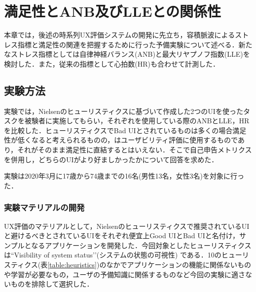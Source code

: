 \chapter{満足性とANB及びLLEとの関係性}
\label{chap:pulsewave}

本章では，後述の時系列UX評価システムの開発に先立ち，容積脈波によるストレス指標と満足性の関連を把握するために行った予備実験について述べる．新たなストレス指標としては自律神経バランス(ANB)と最大リヤプノフ指数(LLE)を検討した．また，従来の指標として心拍数(HR)も合わせて計測した．

\section{実験方法}

実験では，Nielsenのヒューリスティクスに基づいて作成した2つのUIを使ったタスクを被験者に実施してもらい，それぞれを使用している際のANBとLLE，HRを比較した．ヒューリスティクスでBad UIとされているものは多くの場合満足性が低くなると考えられるものの，はユーザビリティ評価に使用するものであり，それがそのまま満足性に直結するとはいえない．そこで自己申告メトリクスを併用し，どちらのUIがより好ましかったかについて回答を求めた．

実験は2020年3月に17歳から74歳までの16名(男性13名，女性3名)を対象に行った．

\subsection{実験マテリアルの開発}

UX評価のマテリアルとして，Nielsenのヒューリスティクスで推奨されているUIと避けるべきとされているUIをそれぞれ便宜上Good UIとBad UIと名付け，サンプルとなるアプリケーションを開発した．今回対象としたヒューリスティクスは``Visibility of system status'’(システムの状態の可視性)\cite{nielsen1990} である．10のヒューリスティクス(表\ref{table:heuristics})のなかでアプリケーションの機能に関係ないものや学習が必要なもの，ユーザの予備知識に関係するものなど今回の実験に適さないものを排除して選択した．

